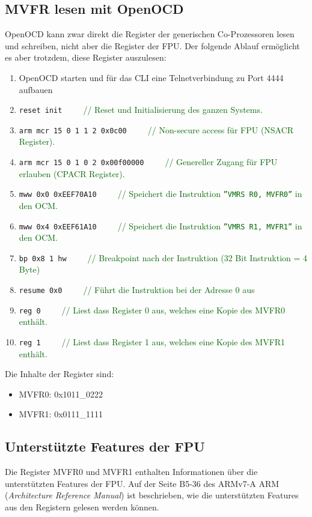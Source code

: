 \subsection{MVFR lesen mit OpenOCD}
OpenOCD kann zwar direkt die Register der generischen Co-Prozessoren lesen und schreiben, nicht aber die Register der FPU.
Der folgende Ablauf ermöglicht es aber trotzdem, diese Register auszulesen:

\begin{enumerate}
\item OpenOCD starten und für das CLI eine Telnetverbindung zu Port 4444 aufbauen
\item \texttt{reset init}\ \ \ \ \ \textcolor{darkgreen}{// Reset und Initialisierung des ganzen Systems.} 
\item \texttt{arm mcr 15 0 1 1 2 0x0c00}\ \ \ \ \ \textcolor{darkgreen}{// Non-secure access für FPU (NSACR Register).} 
\item \texttt{arm mcr 15 0 1 0 2 0x00f00000}\ \ \ \ \ \textcolor{darkgreen}{// Genereller Zugang für FPU erlauben (CPACR Register).} 
\item \texttt{mww 0x0 0xEEF70A10}\ \ \ \ \ \textcolor{darkgreen}{// Speichert die Instruktion \texttt{''VMRS R0, MVFR0''} in den OCM.}
\item \texttt{mww 0x4 0xEEF61A10}\ \ \ \ \ \textcolor{darkgreen}{// Speichert die Instruktion \texttt{''VMRS R1, MVFR1''} in den OCM.}
\item \texttt{bp 0x8 1 hw}\ \ \ \ \ \textcolor{darkgreen}{// Breakpoint nach der Instruktion (32 Bit Instruktion = 4 Byte)}
\item \texttt{resume 0x0}\ \ \ \ \ \textcolor{darkgreen}{// Führt die Instruktion bei der Adresse 0 aus}
\item \texttt{reg 0}\ \ \ \ \ \textcolor{darkgreen}{// Liest dass Register 0 aus, welches eine Kopie des MVFR0 enthält.}
\item \texttt{reg 1}\ \ \ \ \ \textcolor{darkgreen}{// Liest dass Register 1 aus, welches eine Kopie des MVFR1 enthält.}
\end{enumerate}

Die Inhalte der Register sind:
\begin{itemize}
	\item MVFR0:	0x1011\_0222
	\item MVFR1:	0x0111\_1111
\end{itemize}



\subsection{Unterstützte Features der FPU}
Die Register MVFR0 und MVFR1 enthalten Informationen über die unterstützten Features der FPU.
Auf der Seite B5-36 des ARMv7-A ARM\cite{bib:ARMv7ArchitectureReferenceManual} (\textit{Architecture Reference Manual}) ist beschrieben, wie die unterstützten Features aus den Registern gelesen werden können.


